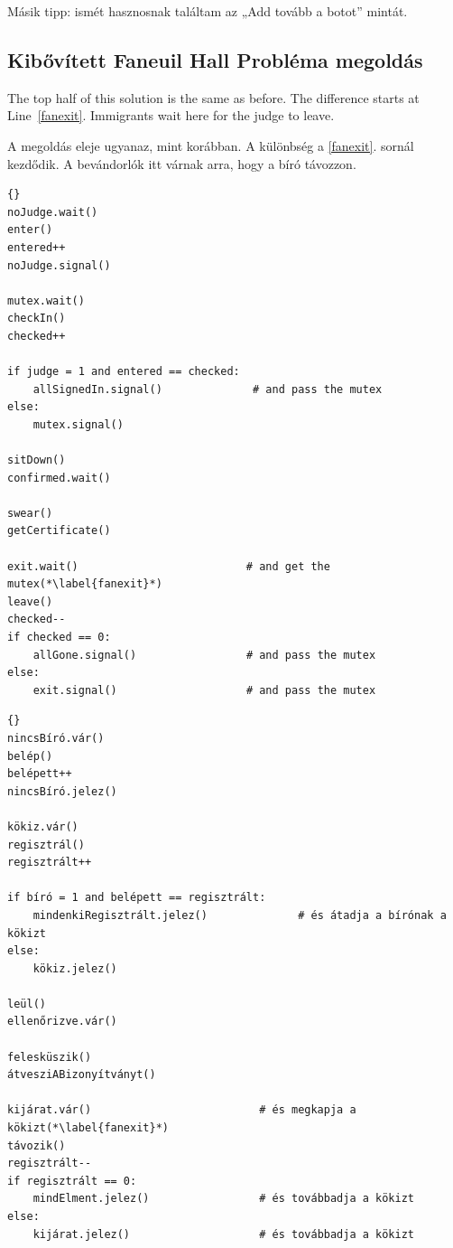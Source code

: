 \documentclass{book}
\newcommand{\clearemptydoublepage}{\newpage\cleardoublepage}
\begin{document}
Másik tipp: ismét hasznosnak találtam az „Add tovább
a botot” mintát.


\clearemptydoublepage
\subsection{Kibővített Faneuil Hall Probléma megoldás}

The top half of this solution is the same as before.  The
difference starts at Line~\ref{fanexit}.  Immigrants wait
here for the judge to leave.

A megoldás eleje ugyanaz, mint korábban. A különbség
a \ref{fanexit}. sornál kezdődik. A bevándorlók itt
várnak arra, hogy a bíró távozzon.

\begin{lstlisting}[title={Faneuil Hall problem solution (immigrant)}]{}
noJudge.wait()
enter()
entered++
noJudge.signal()

mutex.wait()
checkIn()
checked++

if judge = 1 and entered == checked:
    allSignedIn.signal()              # and pass the mutex
else:
    mutex.signal()

sitDown()
confirmed.wait()

swear()
getCertificate()

exit.wait()                          # and get the mutex(*\label{fanexit}*)
leave()
checked--
if checked == 0:
    allGone.signal()                 # and pass the mutex
else:
    exit.signal()                    # and pass the mutex
\end{lstlisting}

\begin{lstlisting}[title={Kibővített Faneuil Hall probléma megoldás (bevándorló)}]{}
nincsBíró.vár()
belép()
belépett++
nincsBíró.jelez()

kökiz.vár()
regisztrál()
regisztrált++

if bíró = 1 and belépett == regisztrált:
    mindenkiRegisztrált.jelez()              # és átadja a bírónak a kökizt
else:
    kökiz.jelez()

leül()
ellenőrizve.vár()

felesküszik()
átvesziABizonyítványt()

kijárat.vár()                          # és megkapja a kökizt(*\label{fanexit}*)
távozik()
regisztrált--
if regisztrált == 0:
    mindElment.jelez()                 # és továbbadja a kökizt
else:
    kijárat.jelez()                    # és továbbadja a kökizt
\end{lstlisting}
\end{document}

